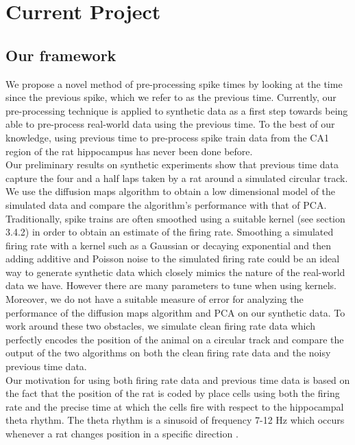 
\section{Current Project}

\subsection{Our framework}

We propose a novel method of pre-processing spike times by looking at the time since the previous spike, which we refer to as the previous time.  Currently, our pre-processing technique is  applied to synthetic data as a first step towards being
able to pre-process  real-world data using the previous time.  To the best of our knowledge, using previous time  to pre-process spike train data from the CA1 region of the rat hippocampus has never been done before.\\

Our preliminary results on synthetic experiments  show  that  previous time data  capture  the  four and a half laps taken by a rat  around a simulated circular track.  We use the diffusion maps algorithm \cite{coifman2006diffusion}  to obtain a low dimensional model of the simulated data and compare the algorithm's performance with that of PCA.\\

Traditionally, spike trains are often smoothed using a suitable kernel (see section 3.4.2) in order to obtain an estimate
of the  firing rate.  Smoothing a simulated firing rate with a kernel such as a Gaussian or decaying exponential  and then adding additive and Poisson noise to the simulated firing rate could be an ideal way to generate synthetic data which closely mimics the nature of the real-world  data we have. However  there are many parameters to tune when using kernels.
Moreover,  we do not have  a suitable measure of error for  analyzing the performance  of the diffusion maps  algorithm and PCA on our synthetic data. To work around these two obstacles, we simulate clean firing rate data which perfectly encodes the position of the animal on a circular track and compare the output of the  two algorithms on both the clean firing rate data and the noisy previous time data. \\

Our motivation for using both  firing rate data  and previous time data  is based on the fact that the position of the rat is coded by place cells using both the firing rate and the precise time at which the cells fire with respect to the hippocampal theta rhythm. The theta rhythm is a sinusoid of frequency 7-12 Hz which occurs whenever a rat changes position in  a specific direction \cite{OKeefe1971, Burgess1993}.\\


